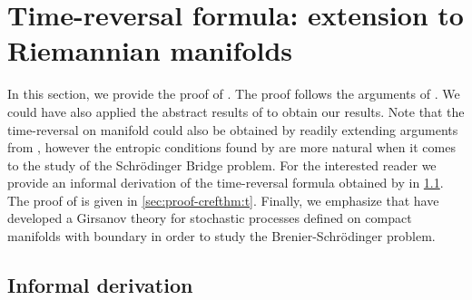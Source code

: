 \section{Time-reversal formula: extension to  Riemannian manifolds}
\label{sec:time-reversal-manifold-proof}

In this section, we provide the proof of .
The proof follows the arguments of \textcite[Theorem 4.9]{cattiaux2021time}.
We could have also applied the abstract results of \textcite[Theorem 5.7]{cattiaux2021time} to obtain our results.
Note that the time-reversal on manifold could also be obtained by readily extending arguments from \textcite{haussmann1986time}, however the entropic conditions found by \textcite{cattiaux2021time} are more natural when it comes to the study of the Schr\"odinger Bridge problem.
For the interested reader we provide an informal derivation of the time-reversal formula obtained by \textcite{haussmann1986time} in \cref{sec:informal-derivation}.
The proof of  is given in \cref{sec:proof-crefthm:t}.
Finally, we emphasize that \textcite{garcia2021brenier} have developed a Girsanov theory for stochastic processes defined on compact manifolds with boundary in order to study the Brenier-Schr\"odinger problem.

\subsection{Informal derivation}
\label{sec:informal-derivation}

